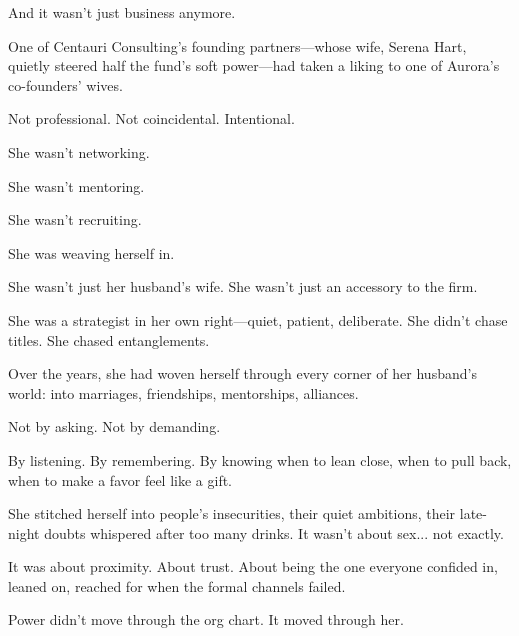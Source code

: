 And it wasn’t just business anymore.

One of Centauri Consulting’s founding partners—whose wife, Serena Hart, quietly steered half the fund’s soft power—had taken a liking to one of Aurora’s co-founders’ wives.

Not professional.  
Not coincidental.  
Intentional.

She wasn’t networking.

She wasn’t mentoring.

She wasn’t recruiting.

She was weaving herself in.

She wasn’t just her husband’s wife.  
She wasn’t just an accessory to the firm.  

She was a strategist in her own right—quiet, patient, deliberate.  
She didn’t chase titles.  
She chased entanglements.  

Over the years, she had woven herself through every corner of her husband’s world:  
into marriages, friendships, mentorships, alliances.  

Not by asking.  
Not by demanding.  

By listening.  
By remembering.  
By knowing when to lean close, when to pull back, when to make a favor feel like a gift.

She stitched herself into people’s insecurities, their quiet ambitions, their late-night doubts whispered after too many drinks.  
It wasn’t about sex... not exactly.  

It was about proximity.  
About trust.  
About being the one everyone confided in, leaned on, reached for when the formal channels failed.

Power didn’t move through the org chart.  
It moved through her.  

\medskip

